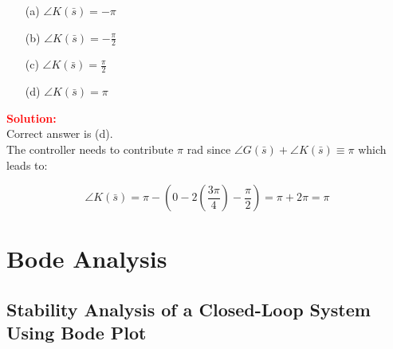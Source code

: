 \documentclass[12pt]{article}
\begin{document}
\begin{itemize}
    \item[(a)] \(\angle K(\bar{s}) = -\pi\)
    \item[(b)] \(\angle K(\bar{s}) = -\frac{\pi}{2}\)
    \item[(c)] \(\angle K(\bar{s}) = \frac{\pi}{2}\)
    \item[(d)] \(\angle K(\bar{s}) = \pi\)
\end{itemize}
\textbf{\textcolor{red}{Solution:}} \\
Correct answer is (d).\\
The controller needs to contribute $\pi $ rad since $\angle G(\bar{s}) +\angle K(\bar{s}) \equiv \pi$ which leads to:

\[
 \angle K(\bar{s}) = \pi - \left( 0 - 2\left( \frac{3 \pi}{4} \right) -\frac{\pi}{2}\right)= \pi +2 \pi =\pi 
\]
\clearpage

\section{Bode Analysis}
\subsection{Stability Analysis of a Closed-Loop System Using Bode Plot}
\end{document}
